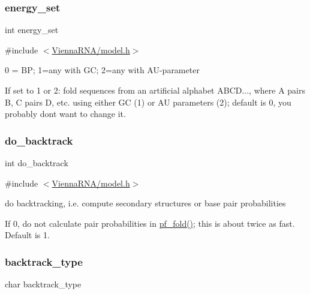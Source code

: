 \subsubsection{\texorpdfstring{energy\+\_\+set}{energy\_set}}
{\footnotesize\ttfamily int energy\+\_\+set}



{\ttfamily \#include $<$\hyperlink{model_8h}{Vienna\+R\+N\+A/model.\+h}$>$}



0 = BP; 1=any with GC; 2=any with A\+U-\/parameter 

If set to 1 or 2\+: fold sequences from an artificial alphabet A\+B\+CD..., where A pairs B, C pairs D, etc. using either GC (1) or AU parameters (2); default is 0, you probably don\textquotesingle{}t want to change it. \mbox{\label{group__model__details_gad512b5dd4dbec60faccfe137bb474489}} 
\subsubsection{\texorpdfstring{do\+\_\+backtrack}{do\_backtrack}}
{\footnotesize\ttfamily int do\+\_\+backtrack}



{\ttfamily \#include $<$\hyperlink{model_8h}{Vienna\+R\+N\+A/model.\+h}$>$}



do backtracking, i.\+e. compute secondary structures or base pair probabilities 

If 0, do not calculate pair probabilities in \hyperlink{group__pf__fold_gadc3db3d98742427e7001a7fd36ef28c2}{pf\+\_\+fold()}; this is about twice as fast. Default is 1. \mbox{\label{group__model__details_ga83bdb43472a259c71e69fa9f70f420c3}} 
\subsubsection{\texorpdfstring{backtrack\+\_\+type}{backtrack\_type}}
{\footnotesize\ttfamily char backtrack\+\_\+type}



